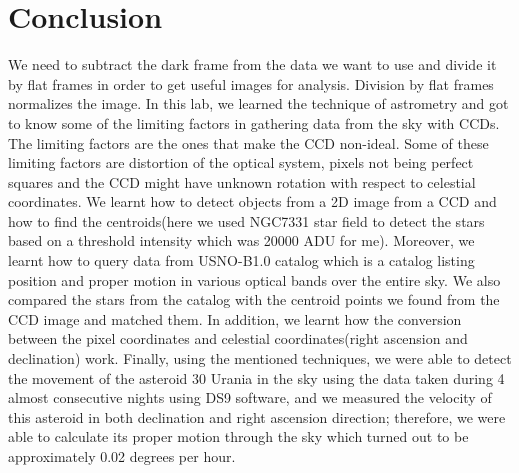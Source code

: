 \documentclass[letterpaper,12pt]{article}
\begin{document}
\section{Conclusion}
\label{sec:conclusion}
We need to subtract the dark frame from the data we want to use and divide it by flat frames in order to get useful images for analysis. Division by flat frames normalizes the image. In this lab, we learned the technique of astrometry and got to know some of the limiting factors in gathering data from the sky with CCDs. The limiting factors are the ones that make the CCD non-ideal. Some of these limiting factors are distortion of the optical system, pixels not being perfect squares and the CCD might have unknown rotation with respect to celestial coordinates. We learnt how to detect objects from a 2D image from a  CCD and how to find the centroids(here we used NGC7331 star field to detect the stars based on a threshold intensity which was 20000 ADU for me). Moreover, we learnt how to query data from USNO-B1.0 catalog which is a catalog listing position and proper motion in various optical bands over the entire sky. We also compared the stars from the catalog with the centroid points we found from the CCD image and matched them. In addition, we learnt how the conversion between the pixel coordinates and celestial coordinates(right ascension and declination) work. Finally, using the mentioned techniques, we were able to detect the movement of the asteroid 30 Urania in the sky using the data taken during 4 almost consecutive nights using DS9 software, and we measured the velocity of this asteroid in both declination and right ascension direction; therefore, we were able to calculate its proper motion through the sky which turned out to be approximately 0.02 degrees per hour.                                                                                                                                                                                                                                                                                                                                                                                                                                                                                                                                                                                                                                                                                                                                                                                                                                                                                                                                                                                                                                                                                                                                                                                                                                                                                                                                                                                                                                                                                                                                              
\end{document}
